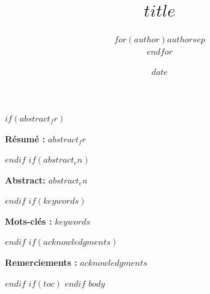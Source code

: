 \documentclass[11pt]{article}
\title{$title$}
\author{$for(author)$$author$$sep$ \\ $endfor$}
\date{$date$}
\renewcommand{\maketitle}{
  \begin{center}
  {\LARGE\bfseries $title$}\par
  \vspace{0.2cm}
  $if(subtitle)$
  {\large\itshape $subtitle$}\par
  \vspace{0.2cm}
  $endif$
  {\large $for(author)$$author$$sep$ \and $endfor$}\par
  {\normalsize $date$}\par
  \end{center}
  \vspace{0.5cm}
}
\begin{document}
\pagestyle{fancy} %

$if(abstract_fr)$
\begin{center}
\begin{minipage}{0.85\textwidth}
\noindent \textbf{Résumé :} $abstract_fr$
\end{minipage}
\end{center}
\vspace{0.5cm}
$endif$
$if(abstract_en)$
\begin{center}
\begin{minipage}{0.85\textwidth}
\noindent \textbf{Abstract:} $abstract_en$
\end{minipage}
\end{center}
\vspace{0.5cm}
$endif$
$if(keywords)$
\begin{center}
\begin{minipage}{0.85\textwidth}
\noindent \textbf{Mots-clés :} $keywords$
\end{minipage}
\end{center}
\vspace{0.5cm}
$endif$
$if(acknowledgments)$
\begin{center}
\begin{minipage}{0.85\textwidth}
\noindent \textbf{Remerciements :} $acknowledgments$
\end{minipage}
\end{center}
\vspace{1cm}
$endif$
$if(toc)$
\clearpage
\tableofcontents
\clearpage
$endif$
\clearpage
$body$
\printbibliography[title={Références}]
\end{document}
